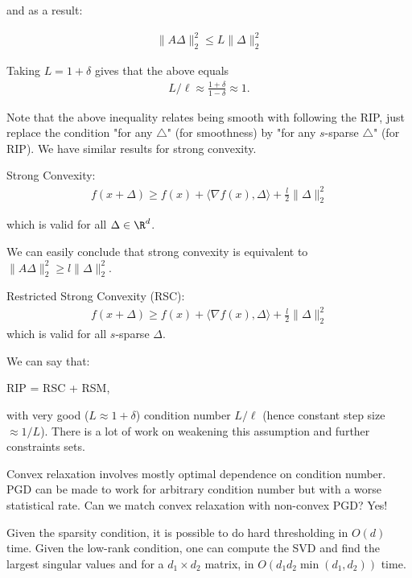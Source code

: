 and as a result:

\begin{align*}
\|A\Delta \|_2^2 \leq L\|\Delta\|_2^2
\end{align*}

Taking $L= 1+ \delta$ gives that the above equals 
\begin{align*}
L/ \ell \approx \frac{1+ \delta}{1- \delta} \approx 1.
\end{align*}

Note that the above inequality relates being smooth with following the RIP, just replace the condition "for any $\triangle$" (for smoothness) by "for any $s$-sparse $\triangle$" (for RIP).
We have similar results for strong convexity.
\begin{definition}
Strong Convexity:
\begin{align*}
f(x+\Delta) \geq f(x) + \langle \nabla f(x), \Delta \rangle + \frac{l}{2} \| \Delta\|_2^2 
\end{align*}

which is valid for all $\Delta \in \R^d$.
\end{definition}
We can easily conclude that strong convexity is equivalent to $\|A\Delta \|_2^2 \geq l\|\Delta\|_2^2$.

\begin{definition}
Restricted Strong Convexity (RSC):
\begin{align*}
f(x+\Delta) \geq f(x) + \langle \nabla f(x), \Delta \rangle + \frac{l}{2} \| \Delta\|_2^2 
\end{align*}
which is valid for all $s$-sparse $\Delta$.
\end{definition}


We can say that:
\begin{center}
RIP = RSC + RSM, 
\end{center}
with very good ($ L \approx 1 + \delta$) condition number $L/\ell$ (hence constant step size $\approx 1/L$).
There is a lot of work on weakening this assumption and further constraints sets.

Convex relaxation involves mostly optimal dependence on condition number.
PGD can be made to work for arbitrary condition number but with a worse statistical rate.
Can we match convex relaxation with non-convex PGD? Yes!

Given the sparsity condition, it is possible to do hard thresholding in $O(d)$ time. Given the low-rank condition, one can compute the SVD and find the largest singular values and for a $d_1 \times d_2$ matrix, in $O(d_1 d_2 \min( d_1, d_2))$ time.



